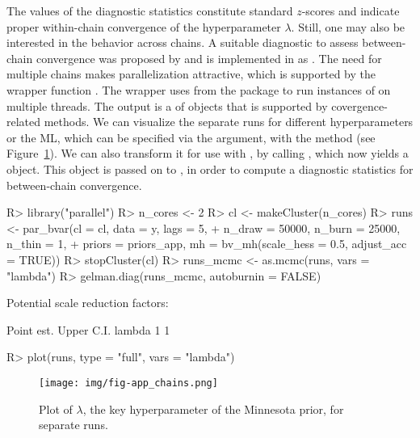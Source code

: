 \documentclass[article,nojss]{jss} %
\begin{document}
\begin{appendix}
The values of the diagnostic statistics constitute standard $z$-scores and indicate proper within-chain convergence of the hyperparameter $\lambda$.
Still, one may also be interested in the behavior across chains. A suitable diagnostic to assess between-chain convergence was proposed by \cite{gelman1992} and is implemented in  as .
The need for multiple chains makes parallelization attractive, which is supported by the wrapper function . The wrapper uses  from the  package \citep{R} to run instances of  on multiple threads. The output is a  of  objects that is supported by covergence-related methods.
We can visualize the separate runs for different hyperparameters or the ML, which can be specified via the  argument, with the  method (see Figure~\ref{fig:app_chains}). We can also transform it for use with , by calling , which now yields a  object.
This object is passed on to , in order to compute a diagnostic statistics for between-chain convergence.

\begin{Schunk}
\begin{Sinput}
R> library("parallel")
R> n_cores <- 2
R> cl <- makeCluster(n_cores)
R> runs <- par_bvar(cl = cl, data = y, lags = 5,
+    n_draw = 50000, n_burn = 25000, n_thin = 1,
+    priors = priors_app, mh = bv_mh(scale_hess = 0.5, adjust_acc = TRUE))
R> stopCluster(cl)
R> runs_mcmc <- as.mcmc(runs, vars = "lambda")
R> gelman.diag(runs_mcmc, autoburnin = FALSE)
\end{Sinput}
\begin{Soutput}
Potential scale reduction factors:

       Point est. Upper C.I.
lambda          1          1
\end{Soutput}
\end{Schunk}
\begin{Schunk}
\begin{Sinput}
R> plot(runs, type = "full", vars = "lambda")
\end{Sinput}
\end{Schunk}

\begin{figure}[ht]
	\centering
  \texttt{[image: img/fig-app\_chains.png]}
	\caption{Plot of $\lambda$, the key hyperparameter of the Minnesota prior, for separate runs.}
	\label{fig:app_chains}
\end{figure}



\end{appendix}
\end{document}
